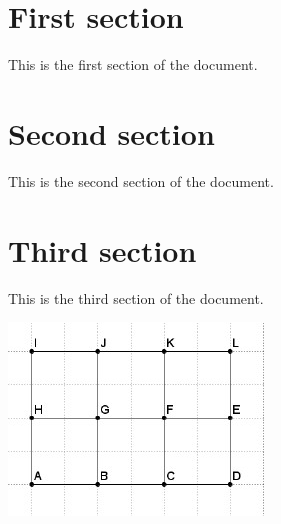 \documentclass{scrartcl}
\begin{document}
\section{First section}
This is the first section of the document.

\section{Second section}
This is the second section of the document.

\section{Third section}
This is the third section of the document.

\includegraphics{interro2.jpg}
\end{document}
